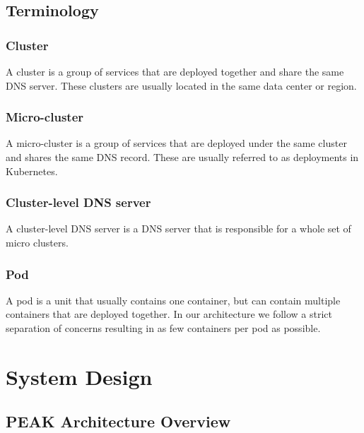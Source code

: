 \documentclass[12pt]{article}
\begin{document}
\subsection{Terminology}
\subsubsection{Cluster}
    A cluster is a group of services that are deployed together and share the same DNS server.
    These clusters are usually located in the same data center or region.
\subsubsection{Micro-cluster}
    A micro-cluster is a group of services that are deployed under the same cluster and shares the same DNS record.
    These are usually referred to as deployments in Kubernetes.
\subsubsection{Cluster-level DNS server}
    A cluster-level DNS server is a DNS server that is responsible for a whole set of micro clusters.
\subsubsection{Pod}
    A pod is a unit that usually contains one container, but can contain multiple containers that are deployed together.
    In our architecture we follow a strict separation of concerns resulting in as few containers per pod as possible.

\section{System Design}
\subsection{PEAK Architecture Overview}
\end{document}
